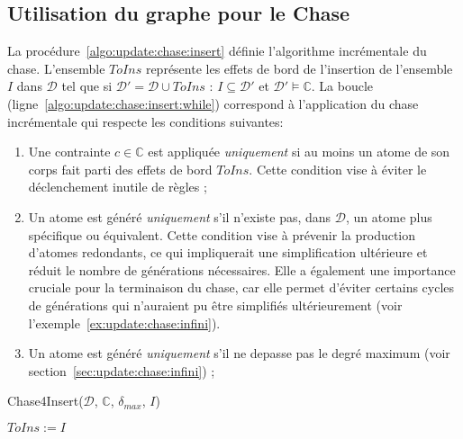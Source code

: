 \subsection{Utilisation du graphe pour le Chase}
La procédure~\ref{algo:update:chase:insert} définie l'algorithme incrémentale du \gls{chase}.
L'ensemble $ToIns$ représente les effets de bord de l'insertion de l'ensemble $I$ dans $\mathcal{D}$ tel que si $\mathcal{D}' = \mathcal{D} \cup ToIns$ : $I \subseteq \mathcal{D}'$ et $\mathcal{D}' \vDash \mathbb{C}$.
La boucle (ligne~\ref{algo:update:chase:insert:while}) correspond à l'application du \gls{chase} incrémentale qui respecte les conditions suivantes:
\begin{enumerate}[label=\textsf{\Circled{\arabic*}}]
    \item Une contrainte $c \in \mathbb{C}$ est appliquée \emph{uniquement} si au moins un atome de son corps fait parti des effets de bord $ToIns$.
          Cette condition vise à éviter le déclenchement inutile de règles ; \label{algo:update:chase:insert:c1}
    \item Un atome est généré \emph{uniquement} s'il n'existe pas, dans $\mathcal{D}$, un atome plus spécifique ou équivalent.
          Cette condition vise à prévenir la production d'atomes redondants, ce qui impliquerait une simplification ultérieure et réduit le nombre de générations nécessaires.
          Elle a également une importance cruciale pour la terminaison du \gls{chase}, car elle permet d'éviter certains cycles de générations qui n'auraient pu être simplifiés ultérieurement (voir l'exemple~\ref{ex:update:chase:infini}). \label{algo:update:chase:insert:c3}
    \item Un atome est généré \emph{uniquement} s'il ne depasse pas le degré maximum (voir section~\ref{sec:update:chase:infini}) ; \label{algo:update:chase:insert:c2}
\end{enumerate}

\begin{procedure}[htb]
    \caption{Chase4Insert($\mathcal{D}$, $\mathbb{C}$, $\delta_{max}$, $I$)}
    \label{algo:update:chase:insert}
    $ToIns := I$ \;
     \;
\end{procedure}

